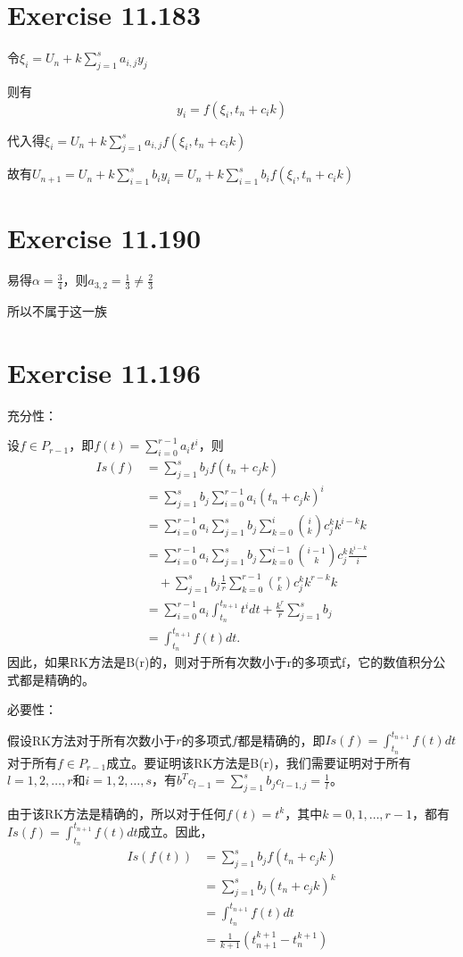 \documentclass[twoside,a4paper]{article}
\begin{document}
\section{Exercise 11.183}

令$\xi_i=U_n+k\sum_{j=1}^sa_{i,j}y_j$

则有$$y_i=f(\xi_i,t_n+c_ik)$$

代入得$\xi_i=U_n+k\sum_{j=1}^sa_{i,j}f(\xi_i,t_n+c_ik)$

故有$U_{n+1}=U_n+k\sum_{i=1}^sb_iy_i=U_n+k\sum_{i=1}^sb_if(\xi_i,t_n+c_ik)$
\section{Exercise 11.190}
易得$\alpha=\frac{3}{4}$，则$a_{3,2}=\frac{1}{3}\neq \frac{2}{3}$

所以不属于这一族

\section{Exercise 11.196}

充分性：

设$f\in P_{r-1}$，即$f(t) = \sum_{i=0}^{r-1} a_i t^i$，则
$$\begin{aligned}
Is(f) &= \sum_{j=1}^s b_j f(t_n + c_jk) \\
&= \sum_{j=1}^s b_j \sum_{i=0}^{r-1} a_i(t_n + c_jk)^i \\
&= \sum_{i=0}^{r-1} a_i \sum_{j=1}^s b_j \sum_{k=0}^i {i\choose k} c_j^k k^{i-k}k \\
&= \sum_{i=0}^{r-1} a_i \sum_{j=1}^s b_j \sum_{k=0}^{i-1} {i-1\choose k} c_j^k \frac{k^{i-k}}{i} \\
&\quad + \sum_{j=1}^s b_j \frac{1}{r} \sum_{k=0}^{r-1} {r\choose k} c_j^k k^{r-k}k \\
&= \sum_{i=0}^{r-1} a_i \int_{t_n}^{t_{n+1}} t^idt + \frac{k^r}{r}\sum_{j=1}^s b_j \\
&= \int_{t_n}^{t_{n+1}} f(t)dt.
\end{aligned}$$
因此，如果RK方法是B(r)的，则对于所有次数小于r的多项式f，它的数值积分公式都是精确的。


必要性：

假设RK方法对于所有次数小于$r$的多项式$f$都是精确的，即$Is(f) = \int_{t_n}^{t_{n+1}} f(t)dt$对于所有$f \in P_{r-1}$成立。要证明该RK方法是B(r)，我们需要证明对于所有$l = 1, 2, \dots, r$和$i = 1, 2, \dots, s$，有$b^Tc_{l-1} = \sum_{j=1}^sb_jc_{l-1,j} = \frac{1}{l}$。

由于该RK方法是精确的，所以对于任何$f(t) = t^k$，其中$k = 0, 1, \dots, r-1$，都有$Is(f) = \int_{t_n}^{t_{n+1}}f(t)dt$成立。因此，
$$\begin{aligned}
Is(f(t)) &= \sum_{j=1}^s b_j f(t_n + c_jk) \\
&= \sum_{j=1}^s b_j (t_n + c_jk)^k \\
&= \int_{t_n}^{t_{n+1}}f(t)dt\\
&=\frac{1}{k+1}(t_{n+1}^{k+1}-t_{n}^{k+1})
\end{aligned}$$
\end{document}
